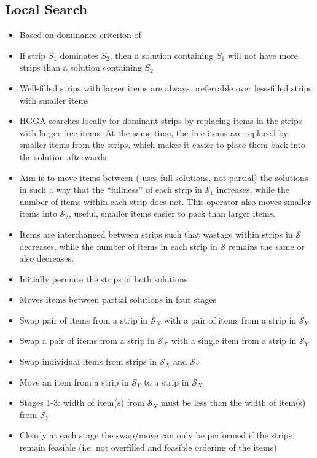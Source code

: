 \documentclass{elsarticle}
\begin{document}
\subsection{Local Search}
\begin{itemize}
	\item Based on dominance criterion of \cite{martello1990b}
	\item If strip $S_1$ dominates $S_2$, then a solution containing $S_1$ will not have more strips than a solution containing $S_2$
	\item Well-filled strips with larger items are always preferrable over less-filled strips with smaller items \cite{levine2004}
	\item HGGA \cite{falkenauer1996} searches locally for dominant strips by replacing items in the strips with larger free items. At the same time, the free items are replaced by smaller items from the strips, which makes it easier to place them back into the solution afterwards
	\item Aim is to move items between (\cite{lewis2009} uses full solutions, not partial) the solutions in such a way that the ``fullness'' of each strip in $\mathcal{S}_1$ increases, while the number of items within each strip does not. This operator also moves smaller items into $\mathcal{S}_2$, useful, smaller items easier to pack than larger items.
	\item Items are interchanged between strips such that wastage within strips in $\mathcal{S}$ decreases, while the number of items in each strip in $\mathcal{S}$ remains the same or also decreases. \cite{lewis2017}
	\item Initially permute the strips of both solutions
	\item Moves items between partial solutions in four stages
	\item Swap pair of items from a strip in $\mathcal{S}_X$ with a pair of items from a strip in $\mathcal{S}_Y$
	\item Swap a pair of items from a strip in $\mathcal{S}_X$ with a single item from a strip in $\mathcal{S}_Y$
	\item Swap individual items from strips in $\mathcal{S}_X$ and $\mathcal{S}_Y$
	\item Move an item from a strip in $\mathcal{S}_Y$ to a strip in $\mathcal{S}_X$
	\item Stages 1-3: width of item(s) from $\mathcal{S}_X$ must be less than the width of item(s) from $\mathcal{S}_Y$
	\item Clearly at each stage the swap/move can only be performed if the strips remain feasible (i.e. not overfilled and feasible ordering of the items)

\end{itemize}
\end{document}
